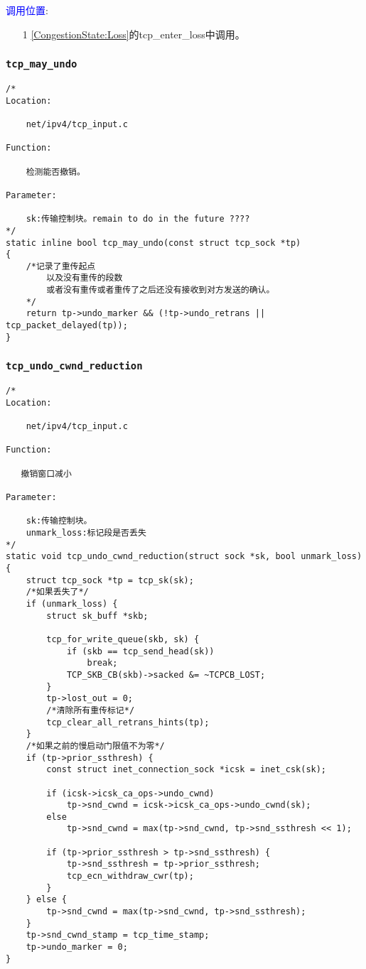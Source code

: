         \textcolor{blue}{调用位置}:

            \begin{enumerate}
                \item[1]        \ref{CongestionState:Loss}的tcp\_enter\_loss中调用。
            \end{enumerate}
        \subsubsection{\texttt{tcp_may_undo}}
            \label{CongestionControlWindowUndo:tcp_may_undo}
\begin{verbatim}
/* 
Location:

    net/ipv4/tcp_input.c

Function:

    检测能否撤销。

Parameter:

    sk:传输控制块。remain to do in the future ????
*/
static inline bool tcp_may_undo(const struct tcp_sock *tp)
{
    /*记录了重传起点
        以及没有重传的段数
        或者没有重传或者重传了之后还没有接收到对方发送的确认。
    */
    return tp->undo_marker && (!tp->undo_retrans || tcp_packet_delayed(tp));
}
\end{verbatim}
        \subsubsection{\texttt{tcp_undo_cwnd_reduction}}
            \label{CongestionControlWindowUndo:tcp_undo_cwnd_reduction}
\begin{verbatim}
/* 
Location:

    net/ipv4/tcp_input.c

Function:

   撤销窗口减小

Parameter:

    sk:传输控制块。
    unmark_loss:标记段是否丢失
*/
static void tcp_undo_cwnd_reduction(struct sock *sk, bool unmark_loss)
{
    struct tcp_sock *tp = tcp_sk(sk);
    /*如果丢失了*/
    if (unmark_loss) {
        struct sk_buff *skb;

        tcp_for_write_queue(skb, sk) {
            if (skb == tcp_send_head(sk))
                break;
            TCP_SKB_CB(skb)->sacked &= ~TCPCB_LOST;
        }
        tp->lost_out = 0;
        /*清除所有重传标记*/
        tcp_clear_all_retrans_hints(tp);
    }
    /*如果之前的慢启动门限值不为零*/
    if (tp->prior_ssthresh) {
        const struct inet_connection_sock *icsk = inet_csk(sk);

        if (icsk->icsk_ca_ops->undo_cwnd)
            tp->snd_cwnd = icsk->icsk_ca_ops->undo_cwnd(sk);
        else
            tp->snd_cwnd = max(tp->snd_cwnd, tp->snd_ssthresh << 1);

        if (tp->prior_ssthresh > tp->snd_ssthresh) {
            tp->snd_ssthresh = tp->prior_ssthresh;
            tcp_ecn_withdraw_cwr(tp);
        }
    } else {
        tp->snd_cwnd = max(tp->snd_cwnd, tp->snd_ssthresh);
    }
    tp->snd_cwnd_stamp = tcp_time_stamp;
    tp->undo_marker = 0;
}
\end{verbatim}
